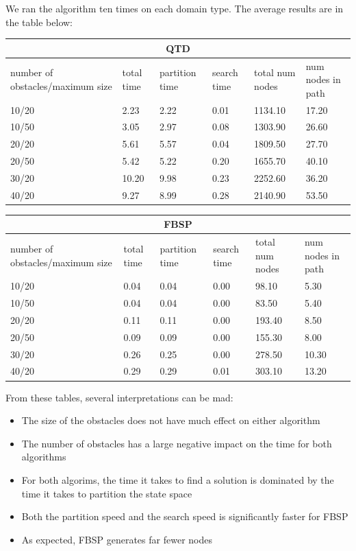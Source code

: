 \documentclass[12pt,a4paper]{article}
\begin{document}
We ran the algorithm ten times on each domain type. The average results are in the table below:\\
\begin{center}
\begin{tabular}{ |p{2cm}||p{2cm}|p{2cm}|p{2cm}| p{2cm} | p{2cm} | }


 \hline
 \multicolumn{6}{|c|}{QTD} \\
 \hline
 number of obstacles/maximum size & total time & partition time & search time & total num nodes & num nodes in path\\
 \hline
 10/20 & 2.23   & 2.22  & 0.01  & 1134.10 & 17.20\\
 10/50 & 3.05   & 2.97  & 0.08  & 1303.90 & 26.60\\
 20/20 & 5.61   & 5.57  & 0.04  & 1809.50 & 27.70\\
 20/50 & 5.42   & 5.22  & 0.20   & 1655.70 & 40.10\\
 30/20 & 10.20   & 9.98 & 0.23  & 2252.60 & 36.20\\
 40/20 & 9.27  & 8.99 & 0.28 & 2140.90 & 53.50\\
 \hline
\end{tabular}
\end{center}

\begin{center}
\begin{tabular}{ |p{2cm}||p{2cm}|p{2cm}|p{2cm}| p{2cm} | p{2cm} | }

 \hline
 \multicolumn{6}{|c|}{FBSP} \\
 \hline
 number of obstacles/maximum size & total time & partition time & search time & total num nodes & num nodes in path\\
 \hline
 10/20 & 0.04   & 0.04  & 0.00  & 98.10 & 5.30\\
 10/50 & 0.04   & 0.04  & 0.00  & 83.50 & 5.40\\
 20/20 & 0.11   & 0.11  & 0.00  & 193.40 & 8.50\\
 20/50 & 0.09   & 0.09  & 0.00   & 155.30 & 8.00\\
 30/20 & 0.26   & 0.25 & 0.00  & 278.50 & 10.30\\
 40/20 & 0.29  & 0.29 & 0.01 & 303.10 & 13.20\\
 \hline
\end{tabular}
\end{center}

From these tables, several interpretations can
be mad:
\begin{itemize}
\item
The size of the obstacles does not have much effect on 
either algorithm
\item
The number of obstacles has a large negative impact on 
the time for both algorithms
\item
For both algorims, the time it takes to find a solution is dominated by the time it takes to partition the state space
\item
Both the partition speed and the search speed is significantly faster for FBSP
\item
As expected, FBSP generates far fewer nodes

\end{itemize}
\end{document}
